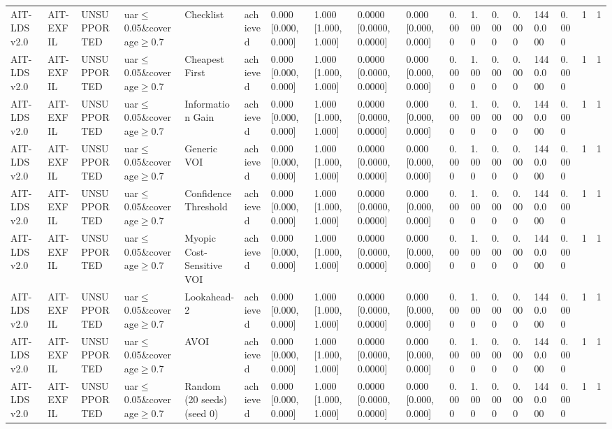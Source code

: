 \begin{table}[!ht]
{\begin{tabular}{llllllllllllllllll}
AIT-LDS v2.0 & AIT-EXFIL & UNSUPPORTED & uar$\le$0.05\&coverage$\ge$0.7 & Checklist & achieved & 0.000 [0.000, 0.000] & 1.000 [1.000, 1.000] & 0.0000 [0.0000, 0.0000] & 0.000 [0.000, 0.000] & 0.000 & 1.000 & 0.000 & 0.000 & 1440.000 & 0.000 & 1 & 1 \\
AIT-LDS v2.0 & AIT-EXFIL & UNSUPPORTED & uar$\le$0.05\&coverage$\ge$0.7 & Cheapest First & achieved & 0.000 [0.000, 0.000] & 1.000 [1.000, 1.000] & 0.0000 [0.0000, 0.0000] & 0.000 [0.000, 0.000] & 0.000 & 1.000 & 0.000 & 0.000 & 1440.000 & 0.000 & 1 & 1 \\
AIT-LDS v2.0 & AIT-EXFIL & UNSUPPORTED & uar$\le$0.05\&coverage$\ge$0.7 & Information Gain & achieved & 0.000 [0.000, 0.000] & 1.000 [1.000, 1.000] & 0.0000 [0.0000, 0.0000] & 0.000 [0.000, 0.000] & 0.000 & 1.000 & 0.000 & 0.000 & 1440.000 & 0.000 & 1 & 1 \\
AIT-LDS v2.0 & AIT-EXFIL & UNSUPPORTED & uar$\le$0.05\&coverage$\ge$0.7 & Generic VOI & achieved & 0.000 [0.000, 0.000] & 1.000 [1.000, 1.000] & 0.0000 [0.0000, 0.0000] & 0.000 [0.000, 0.000] & 0.000 & 1.000 & 0.000 & 0.000 & 1440.000 & 0.000 & 1 & 1 \\
AIT-LDS v2.0 & AIT-EXFIL & UNSUPPORTED & uar$\le$0.05\&coverage$\ge$0.7 & Confidence Threshold & achieved & 0.000 [0.000, 0.000] & 1.000 [1.000, 1.000] & 0.0000 [0.0000, 0.0000] & 0.000 [0.000, 0.000] & 0.000 & 1.000 & 0.000 & 0.000 & 1440.000 & 0.000 & 1 & 1 \\
AIT-LDS v2.0 & AIT-EXFIL & UNSUPPORTED & uar$\le$0.05\&coverage$\ge$0.7 & Myopic Cost-Sensitive VOI & achieved & 0.000 [0.000, 0.000] & 1.000 [1.000, 1.000] & 0.0000 [0.0000, 0.0000] & 0.000 [0.000, 0.000] & 0.000 & 1.000 & 0.000 & 0.000 & 1440.000 & 0.000 & 1 & 1 \\
AIT-LDS v2.0 & AIT-EXFIL & UNSUPPORTED & uar$\le$0.05\&coverage$\ge$0.7 & Lookahead-2 & achieved & 0.000 [0.000, 0.000] & 1.000 [1.000, 1.000] & 0.0000 [0.0000, 0.0000] & 0.000 [0.000, 0.000] & 0.000 & 1.000 & 0.000 & 0.000 & 1440.000 & 0.000 & 1 & 1 \\
AIT-LDS v2.0 & AIT-EXFIL & UNSUPPORTED & uar$\le$0.05\&coverage$\ge$0.7 & AVOI & achieved & 0.000 [0.000, 0.000] & 1.000 [1.000, 1.000] & 0.0000 [0.0000, 0.0000] & 0.000 [0.000, 0.000] & 0.000 & 1.000 & 0.000 & 0.000 & 1440.000 & 0.000 & 1 & 1 \\
AIT-LDS v2.0 & AIT-EXFIL & UNSUPPORTED & uar$\le$0.05\&coverage$\ge$0.7 & Random (20 seeds) (seed 0) & achieved & 0.000 [0.000, 0.000] & 1.000 [1.000, 1.000] & 0.0000 [0.0000, 0.0000] & 0.000 [0.000, 0.000] & 0.000 & 1.000 & 0.000 & 0.000 & 1440.000 & 0.000 & 1 & 1 \\

\end{tabular}}
\end{table}
